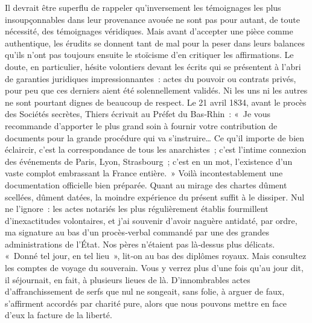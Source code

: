 \documentclass[french,twoside]{book} %
\newcommand{\astermono}{\medskip\centerline{\color{rubric}\large\selectfont{\syms ✻}}\medskip\par}%
\begin{document}
Il devrait être superflu de rappeler qu’inversement les témoignages les plus insoupçonnables dans leur provenance avouée ne sont pas pour autant, de toute nécessité, des témoignages véridiques. Mais avant d’ac­cepter une pièce comme authentique, les érudits se donnent tant de mal pour la peser dans leurs balances qu’ils n’ont pas toujours ensuite le stoïcisme d’en critiquer les affirmations. Le doute, en particulier, hésite volontiers devant les écrits qui se présentent à l’abri de garanties juri­diques impressionnantes : actes du pouvoir ou contrats privés, pour peu que ces derniers aient été solennellement validés. Ni les uns ni les autres ne sont pourtant dignes de beaucoup de respect. Le 21 avril 1834, avant le procès des Sociétés secrètes, Thiers écrivait au Préfet du Bas‑Rhin : « Je vous recommande d’apporter le plus grand soin à fournir votre contri­bution de documents pour la grande procédure qui va s’instruire… Ce qu’il importe de bien éclaircir, c’est la correspondance de tous les anar­chistes ; c’est l’intime connexion des événements de Paris, Lyon, Stras­bourg ; c’est en un mot, l’existence d’un vaste complot embrassant la France entière. » Voilà incontestablement une documentation officielle bien préparée. Quant au mirage des chartes dûment scellées, dûment datées, la moindre expérience du présent suffit à le dissiper. Nul ne l’ignore : les actes notariés les plus régulièrement établis fourmillent d’inexactitudes volontaires, et j’ai souvenir d’avoir naguère antidaté, par ordre, ma signature au bas d’un procès‑verbal commandé par une des grandes administrations de l’État. Nos pères n’étaient pas là‑dessus plus délicats. « Donné tel jour, en tel lieu », lit‑on au bas des diplômes royaux. Mais consultez les comptes de voyage du souverain. Vous y verrez plus d’une fois qu’au jour dit, il séjournait, en fait, à plusieurs lieues de là. D’innom­brables actes d’affranchissement de serfs que nul ne songeait, sans folie, à arguer de faux, s’affirment accordés par charité pure, alors que nous pouvons mettre en face d’eux la facture de la liberté.\par

\astermono
\end{document}
